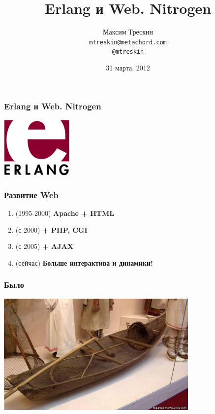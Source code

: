 \documentclass[14pt]{beamer}
\title{Erlang и Web. Nitrogen}
\author{Максим Трескин\\ \texttt{mtreskin@metachord.com} \\ \texttt{@mtreskin}}
\date[2012.03.31]{31 марта, 2012}
\begin{document}
\begin{frame}
  \titlepage
\end{frame}


\begin{frame}
  \frametitle{Erlang и Web. Nitrogen}
  \begin{center}
    \begin{minipage}[t]{90px}
      \hfil
      \includegraphics[height=3cm]{erlang.png}
      \hfil
    \end{minipage}
  \end{center}
\end{frame}

\begin{frame}
  \frametitle{Развитие Web}
  \begin{enumerate}
  \item (1995-2000) \textbf{\color{darkgray}Apache + HTML}
  \item (с 2000) \textbf{\color{darkgray}+ PHP, CGI}
  \item (с 2005) \textbf{\color{darkgray}+ AJAX}
  \item (сейчас) \textbf{\color{darkgray}Больше интерактива и динамики!}
  \end{enumerate}
\end{frame}


\begin{frame}
  \frametitle{Было}
      \hfil
      \includegraphics[height=6cm]{dolb_ship.jpg}
      \hfil

\end{frame}
\end{document}
